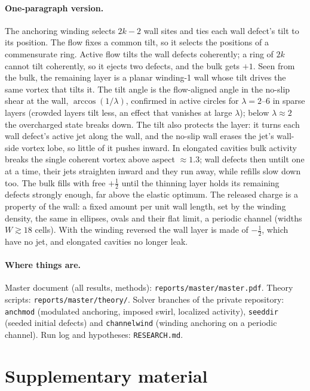 \documentclass[11pt,a4paper]{article}
\newcommand{\half}{\tfrac12}
\begin{document}
\paragraph{One-paragraph version.} The anchoring winding selects $2k-2$ wall sites and ties each wall defect's tilt to its position. The flow fixes a common tilt, so it
selects the positions of a commensurate ring. Active flow tilts the wall defects coherently; a ring of $2k$ cannot tilt coherently, so it ejects two defects, and the bulk gets $+1$. Seen from the bulk, the
remaining layer is a planar winding-1 wall whose tilt drives the same vortex that tilts it. The tilt angle is the flow-aligned angle in the no-slip shear at the wall, $\arccos(1/\lambda)$,
confirmed in active circles for $\lambda=2$--6 in sparse layers (crowded layers tilt less, an effect that vanishes at large $\lambda$); below $\lambda\approx2$ the overcharged state breaks down. The tilt also protects the layer: it turns each wall defect's active jet along the wall,
and the no-slip wall erases the jet's wall-side vortex lobe, so little of it pushes inward. In elongated cavities bulk activity breaks the single coherent vortex above aspect $\approx1.3$;
wall defects then untilt one at a time, their jets straighten inward and they run away, while refills slow down too. The bulk fills with free $+\half$ until the thinning layer holds its
remaining defects strongly enough, far above the elastic optimum. The released charge is a property of the wall: a fixed amount per unit wall length, set by the winding density,
the same in ellipses, ovals and their flat limit, a periodic channel (widths $W\gtrsim18$ cells). With the winding reversed the wall layer is made of $-\half$, which have no jet, and
elongated cavities no longer leak.

\paragraph{Where things are.} Master document (all results, methods): \texttt{reports/master/master.pdf}. Theory scripts: \texttt{reports/master/theory/}.
Solver branches of the private repository: \texttt{anchmod} (modulated anchoring, imposed swirl, localized activity), \texttt{seeddir} (seeded initial defects) and \texttt{channelwind} (winding anchoring on a periodic channel). Run log and hypotheses: \texttt{RESEARCH.md}.

\clearpage
\appendix
\section*{Supplementary material}
\end{document}
